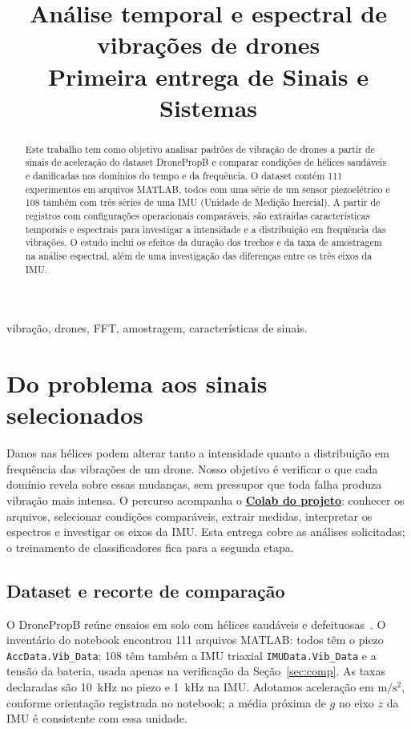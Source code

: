 \documentclass[conference,a4paper]{IEEEtran}
\newcommand{\U}{\mathrm{m}/\mathrm{s}^{2}}
\begin{document}
\title{Análise temporal e espectral de vibrações de drones\\[0.3em]
\large Primeira entrega de Sinais e Sistemas}
\author{
}
\maketitle
\begin{abstract}
Este trabalho tem como objetivo analisar padrões de vibração de drones a partir de sinais de aceleração do dataset DronePropB e comparar condições de hélices saudáveis e danificadas nos domínios do tempo e da frequência. O dataset contém 111 experimentos em arquivos MATLAB, todos com uma série de um sensor piezoelétrico e 108 também com três séries de uma IMU (Unidade de Medição Inercial). A partir de registros com configurações operacionais comparáveis, são extraídas características temporais e espectrais para investigar a intensidade e a distribuição em frequência das vibrações. O estudo inclui os efeitos da duração dos trechos e da taxa de amostragem na análise espectral, além de uma investigação das diferenças entre os três eixos da IMU.

\end{abstract}
\begin{IEEEkeywords}
vibração, drones, FFT, amostragem, características de sinais.
\end{IEEEkeywords}

\section{Do problema aos sinais selecionados}
Danos nas hélices podem alterar tanto a intensidade quanto a distribuição em frequência das vibrações de um drone. Nosso objetivo é verificar o que cada domínio revela sobre essas mudanças, sem pressupor que toda falha produza vibração mais intensa. O percurso acompanha o \href{https://colab.research.google.com/drive/1FdcHGuE1c6JbiSro7K0QYuGb-4w69KOJ?usp=sharing}{\textbf{Colab do projeto}}: conhecer os arquivos, selecionar condições comparáveis, extrair medidas, interpretar os espectros e investigar os eixos da IMU. Esta entrega cobre as análises solicitadas; o treinamento de classificadores fica para a segunda etapa.

\subsection{Dataset e recorte de comparação}
O DronePropB reúne ensaios em solo com hélices saudáveis e defeituosas~\cite{dataset}. O inventário do notebook encontrou 111 arquivos MATLAB: todos têm o piezo \texttt{AccData.Vib\_Data}; 108 têm também a IMU triaxial \texttt{IMUData.Vib\_Data} e a tensão da bateria, usada apenas na verificação da Seção~\ref{sec:comp}. As taxas declaradas são 10~kHz no piezo e 1~kHz na IMU. Adotamos aceleração em $\U$, conforme orientação registrada no notebook; a média próxima de $g$ no eixo $z$ da IMU é consistente com essa unidade.
\end{document}
